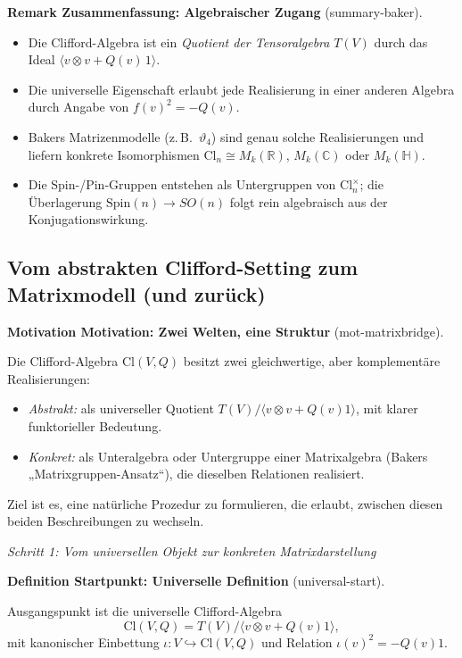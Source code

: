 \documentclass[10pt, letterpaper]{article}
\newcommand{\R}{\mathbb{R}}
\newcommand{\C}{\mathbb{C}}
\newcommand{\QU}{\mathbb{H}}
\newcommand{\Cl}{\mathrm{Cl}}
\newcommand{\Spin}{\mathrm{Spin}}
\newcommand{\CustomHeading}[3]{%
  \par\medskip\noindent%
  \textbf{#1 #2} \textnormal{(#3)}.\enskip%
}
\newenvironment{DEF}[2]{\begin{unitbox}\CustomHeading{Definition}{#1}{#2}}{\end{unitbox}}
\newenvironment{REM}[2]{\begin{unitbox}\CustomHeading{Remark}{#1}{#2}}{\end{unitbox}}
\newenvironment{MOT}[2]{\begin{unitbox}\CustomHeading{Motivation}{#1}{#2}}{\end{unitbox}}
\begin{document}
\begin{REM}{Zusammenfassung: Algebraischer Zugang}{summary-baker}
\begin{itemize}[leftmargin=*]
\item Die Clifford-Algebra ist ein \emph{Quotient der Tensoralgebra}
  $T(V)$ durch das Ideal
  $\langle v\otimes v+Q(v)\,1\rangle$.
\item Die universelle Eigenschaft erlaubt jede Realisierung in
  einer anderen Algebra durch Angabe von $f(v)^2=-Q(v)$.
\item Bakers Matrizenmodelle (z.\,B.\ $\vartheta_4$) sind genau solche
  Realisierungen und liefern konkrete Isomorphismen
  $\Cl_n\cong M_{k}(\R)$, $M_{k}(\C)$ oder $M_{k}(\QU)$.
\item Die Spin-/Pin-Gruppen entstehen als Untergruppen von
  $\Cl_n^\times$; die Überlagerung $\Spin(n)\to SO(n)$
  folgt rein algebraisch aus der Konjugationswirkung.
\end{itemize}
\end{REM}



\subsection{Vom abstrakten Clifford-Setting zum Matrixmodell (und zurück)}
\label{sec:clifford-matrixbridge}

\begin{MOT}{Motivation: Zwei Welten, eine Struktur}{mot-matrixbridge}
Die Clifford-Algebra $\Cl(V,Q)$ besitzt zwei gleichwertige, aber
komplementäre Realisierungen:
\begin{itemize}[leftmargin=*]
\item[(i)] \emph{Abstrakt:} als universeller Quotient $T(V)/\langle v\otimes v+Q(v)1\rangle$,
  mit klarer funktorieller Bedeutung.
\item[(ii)] \emph{Konkret:} als Unteralgebra oder Untergruppe einer Matrixalgebra
  (Bakers „Matrixgruppen-Ansatz“), die dieselben Relationen realisiert.
\end{itemize}
Ziel ist es, eine natürliche Prozedur zu formulieren, die erlaubt,
zwischen diesen beiden Beschreibungen zu wechseln.
\end{MOT}

\emph{Schritt 1: Vom universellen Objekt zur konkreten Matrixdarstellung}

\begin{DEF}{Startpunkt: Universelle Definition}{universal-start}
Ausgangspunkt ist die universelle Clifford-Algebra
\[
\Cl(V,Q) = T(V)\big/\langle v\otimes v + Q(v)1\rangle,
\]
mit kanonischer Einbettung $\iota:V\hookrightarrow \Cl(V,Q)$
und Relation $\iota(v)^2=-Q(v)1$.
\end{DEF}
\end{document}

